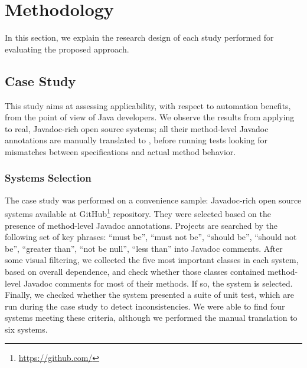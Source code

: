 \section{Methodology}
\label{sec:researchDesign}

In this section, we explain the research design of each study performed for
evaluating the proposed approach.

\subsection{Case Study}
\label{sec:caseStudy}
This study aims at assessing \contractjdoc{} applicability, with respect to automation benefits, from the point of view of Java developers. 
We observe the results from applying \contractjdoc{} to \totalSystems{} real,
Javadoc-rich open source systems; all their method-level
Javadoc annotations are manually translated to \contractjdoc{}, before
running tests looking for mismatches between specifications and actual method
behavior.

\subsubsection{Systems Selection} 
\label{sec:systems}

The case study was performed on a convenience sample: \totalSystems{}
Javadoc-rich open source systems available at GitHub\footnote{\url{https://github.com/}} repository.
They were selected based on the presence of method-level Javadoc annotations. 
Projects are searched by the following set of key phrases: ``must be'', ``must not be'', ``should
be'', ``should not be'', ``greater than'', ``not be null'', ``less than'' into Javadoc
comments.
After some visual filtering, we collected the five most important classes in
each system, based on overall dependence, and check whether those classes
contained method-level Javadoc comments for most of their methods. If so, the
system is selected. Finally, we checked whether the system presented a suite of
unit test, which are run during the case study to detect inconsistencies. We
were able to find four systems meeting these criteria, although we performed the
manual translation to six systems.

